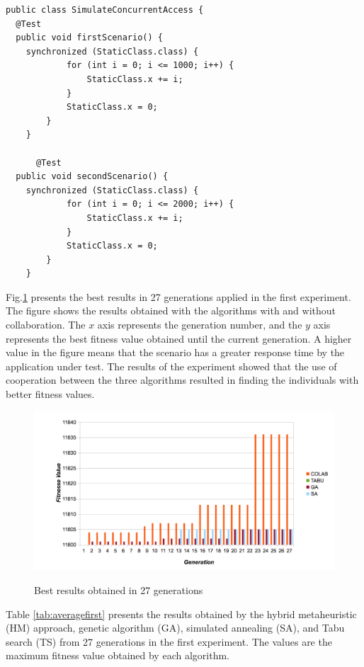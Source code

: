 \documentclass[espaco=umemeio,chapter=TITLE,twoside,openright]{abnt}
\begin{document}
\begin{lstlisting}[style=outline,caption={SimulateConcurrentAccess class},float,label=classsimulated]
public class SimulateConcurrentAccess {
  @Test
  public void firstScenario() {
    synchronized (StaticClass.class) {
			for (int i = 0; i <= 1000; i++) {
				StaticClass.x += i;
			}
			StaticClass.x = 0;
		}
	}

	  @Test
  public void secondScenario() {
    synchronized (StaticClass.class) {
			for (int i = 0; i <= 2000; i++) {
				StaticClass.x += i;
			}
			StaticClass.x = 0;
		}
	}
\end{lstlisting}


Fig.\ref{fig:exp1bestresults} presents the best results in 27 generations applied in the first experiment. The figure shows the results obtained with the algorithms with and without collaboration. The $x$ axis  represents the generation number, and the $y$ axis represents the best fitness value obtained until the current generation.
A higher value in the figure means that the scenario has a greater response time by the application under test. The results of the experiment showed that the use of cooperation between the three algorithms resulted in finding the individuals with better fitness values.

\begin{figure}[h]
\centering
\caption{Best results obtained in 27 generations}
\includegraphics[width=1\textwidth]{./images/generationcomparative.png}
\label{fig:exp1bestresults}
\end{figure}

Table \ref{tab:averagefirst} presents the results obtained by the hybrid metaheuristic (HM) approach, genetic algorithm (GA), simulated annealing (SA), and Tabu search (TS) from 27 generations in the first experiment. The values are the maximum fitness value obtained by each algorithm.
\end{document}
